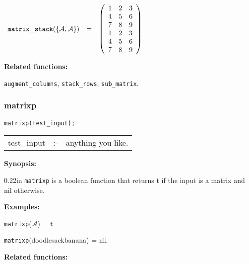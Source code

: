 \vspace*{0.1in}

\begin{flushleft}  
\hspace*{0.1in}
\begin{math}  
\begin{array}{ccc}
{\tt matrix\_stack}(\{{\cal A,A}\}) & = & 
        \left( \begin{array}{ccc} 1 & 2 & 3 \\ 4 & 5 & 6 \\ 7 & 8 & 9 
\\ 1 & 2 & 3 \\ 4 & 5 & 6 \\ 7 & 8 & 9 
 \end{array} \right) 
\end{array}
\end{math}  
\end{flushleft}

{\bf Related functions:}

\hspace*{0.175in} {\tt augment\_columns}, {\tt stack\_rows}, 
{\tt sub\_matrix}.


\subsubsection{matrixp}
\label{linalg:matrixp}

\hspace*{0.175in} {\tt matrixp(test\_input);}

\hspace*{0.1in}  
\begin{tabular}{l l l}
test\_input &:-& anything you like.
\end{tabular}

{\bf Synopsis:} %

\begin{addtolength}{\leftskip}{0.22in}
{\tt matrixp} is a boolean function that returns t if 
                the input is a matrix and nil otherwise.

\end{addtolength}

{\bf Examples:}

\hspace*{0.175in} {\tt matrixp}($\mathcal{A}$) = t 

\hspace*{0.175in} {\tt matrixp}(doodlesackbanana) = nil

{\bf Related functions:}


